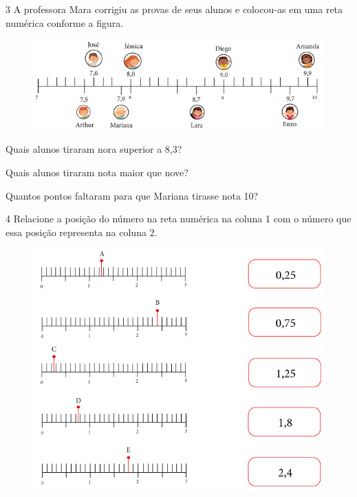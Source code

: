 \num{3} A professora Mara corrigiu as provas de seus alunos e colocou-as em
uma reta numérica conforme a figura.

\begin{figure}[htpb!]
\includegraphics[width=\textwidth]{../ilustracoes/MAT5/SAEB_5ANO_MAT_figura87.png}
\end{figure}

\begin{escolha}
\item
  Quais alunos tiraram nora superior a 8,3?

\bigskip
\bigskip
\bigskip

\item
  Quais alunos tiraram nota maior que nove?

\bigskip
\bigskip
\bigskip

\item
  Quantos pontos faltaram para que Mariana tirasse nota 10?

\bigskip
\bigskip
\bigskip
\end{escolha}

\pagebreak
\num{4} Relacione a posição do número na reta numérica na coluna 1 com o
número que essa posição representa na coluna 2.

\begin{figure}[htpb!]
\centering
\includegraphics[width=.8\textwidth]{../ilustracoes/MAT5/SAEB_5ANO_MAT_figura88.png}
\end{figure}

